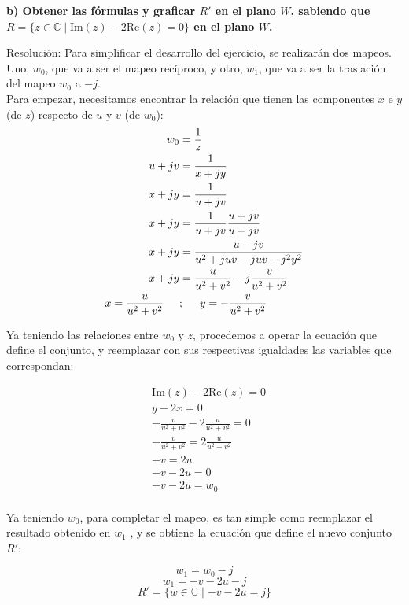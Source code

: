 \documentclass[12pt,a4paper]{report}
\begin{document}
\textbf{b) Obtener las fórmulas y graficar \( R' \) en el plano \( W \), sabiendo que \( R = \{z \in \mathbb{C} \mid \text{Im}(z) - 2\text{Re}(z) = 0\} \) en el plano \( W \).}

Resolución: Para simplificar el desarrollo del ejercicio, se realizarán dos mapeos. Uno, \( w_0 \), que va a ser el mapeo recíproco, y otro, \( w_1 \), que va a ser la traslación del mapeo \( w_0 \) a \( -j \).\\

Para empezar, necesitamos encontrar la relación que tienen las componentes $x$ e $y$ (de $z$) respecto de $u$ y $v$ (de $w_0$):
\begin{align*}
    w_0 &=\frac{1}{z}\\
    u+jv &=\frac{1}{x+jy}\\
    x+jy &= \frac{1}{u+jv}\\
    x+jy &= \frac{1}{u+jv} \frac{u-jv}{u-jv}\\
    x+jy &= \frac{u-jv}{u^2+juv-juv-j^2y^2}\\
    x+jy &= \frac{u}{u^2+v^2}-j\frac{v}{u^2+v^2}\\
    x=\frac{u}{u^2+v^2} \hspace{0.5cm} &;\hspace{0.5cm} y=-\frac{v}{u^2+v^2}\\
\end{align*}


Ya teniendo las relaciones entre \( w_0 \) y \( z \), procedemos a operar la ecuación que define el conjunto, y reemplazar con sus respectivas igualdades las variables que correspondan:

\begin{align*}
&\text{Im}(z) - 2\text{Re}(z) = 0\\ 
&y - 2x = 0\\ 
&-\frac{v}{u^2 + v^2} - 2\frac{u}{u^2 + v^2} = 0\\ 
&-\frac{v}{u^2 + v^2} = 2\frac{u}{u^2 + v^2}\\ 
&-v=2u\\
&-v - 2u = 0\\ 
&-v - 2u = w_0\\ 
\end{align*}

Ya teniendo $w_0$, para completar el mapeo, es tan simple como reemplazar el resultado obtenido en $w_1$ , y se obtiene la ecuación que define el nuevo conjunto $R'$:

$$ w_1 = w_0 - j $$
$$ w_1 = -v - 2u - j $$
$$ R' = \{w \in \mathbb{C} \mid -v - 2u = j\} $$
\end{document}
